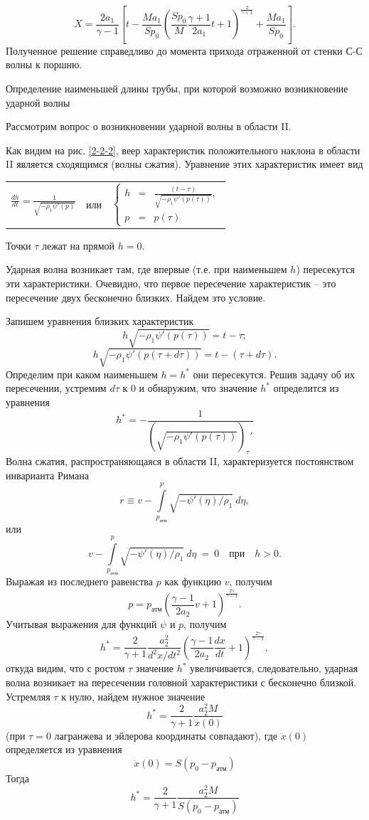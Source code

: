 \documentclass[specialist, subf, href, colorlinks=true, 14pt, final]{disser}
\theoremstyle{definition}
\begin{document}
\[ 
	X = \frac{2a_1}{\gamma - 1}\left[t - \frac{Ma_1}{S p_0}\left( \frac{Sp_0}{M} \frac{\gamma +1}{2 a_1}t +1 \right)^{\displaystyle \frac{2}{ \displaystyle \gamma +1}} + \frac{Ma_1}{Sp_0} \right].
\]
Полученное решение справедливо до момента прихода отраженной от стенки С-С волны к поршню.

Определение наименьшей длины трубы, при которой возможно возникновение ударной волны

Рассмотрим вопрос о возникновении ударной волны в области II.

Как видим на рис. \ref{2-2-2}, веер характеристик положительного  наклона в области II является сходящимся (волны сжатия). Уравнение этих характеристик имеет вид
\begin{center}
		\begin{tabular}{c c c}
			$ \displaystyle \frac{dh}{dt} = \displaystyle \frac{1}{\sqrt{-\rho_1 \psi ' (p)}} $ & $\text{или}$ & 
			$ \left\{
    			\begin{array}{lcl}  
     	 			h &=& \displaystyle \frac{(t-\tau)}{\sqrt{-\rho_1 \psi '(p(\tau))}} , \\
     	 			p &=& p(\tau)
    			\end{array}
  			\right.$ \\
		\end{tabular} 
\end{center}
Точки $\tau$ лежат на прямой $h = 0$.

Ударная волна возникает там, где впервые (т.е. при наименьшем $h$) пересекутся эти характеристики. Очевидно, что первое пересечение характеристик -- это пересечение двух бесконечно близких. Найдем это условие.

Запишем уравнения близких характеристик
\[
	h\sqrt{- \rho_1 \psi' (p(\tau)) } = t- \tau;
\]
\[
	h\sqrt{- \rho_1 \psi' (p(\tau + d\tau)) } = t- (\tau + d\tau) .
\]
Определим при каком наименьшем $h=h^*$ они пересекутся. Решив задачу об их пересечении, устремим $d\tau$ к 0 и обнаружим, что значение $h^*$ определится из уравнения
\[
	h^* = - \frac{1}{\left(\sqrt{- \rho_1 \psi' (p(\tau))} \right) _{\tau}' }
\]
Волна сжатия, распространяющаяся в области II, характеризуется постоянством инварианта Римана
\[
	r \equiv v - \int\limits^{p}_{p_{\text{атм}}} \sqrt{- \psi'(\eta)/\rho_1}\ d\eta,
\]
или
\[
	v - \int\limits^{p}_{p_{\text{атм}}} \sqrt{- \psi'(\eta)/\rho_1}\ d\eta\ =\ 0 \quad \text{при} \quad h > 0.
\]
Выражая из последнего равенства $p$ как функцию $v$, получим
\[
	p = p_{\text{атм}} \left( \frac{\gamma - 1}{2 a_2}v + 1 \right)^{\displaystyle \frac{2\gamma}{\gamma - 1}} .
\]
Учитывая выражения для функций $\psi$ и $p$, получим
\[
	h^* = \frac{2}{\gamma + 1} \frac{a_2^2}{d^2x/dt^2} \left( \frac{\gamma - 1}{2 a_2} \frac{dx}{dt} +1  \right)^{\displaystyle \frac{2\gamma}{\gamma - 1}},
\]
откуда видим, что с ростом $\tau$ значение $h^*$ увеличивается, следовательно, ударная волна возникает на пересечении головной характеристики с бесконечно близкой. Устремляя $\tau$ к нулю, найдем нужное значение
\[
	h^* = \frac{2}{\gamma + 1} \frac{a_2^2 M}{\ddot{x}(0)}
\]
(при $\tau=0$ лагранжева и эйлерова координаты совпадают), где $\ddot{x}(0)$ определяется из уравнения
\[
	\ddot{x}(0) = S (p_0 - p_{\text{атм}})
\]
Тогда
\[
	h^* = \frac{2}{\gamma + 1} \frac{a_2^2 M}{S (p_0 - p_{\text{атм}}) }
\]
\end{document}
